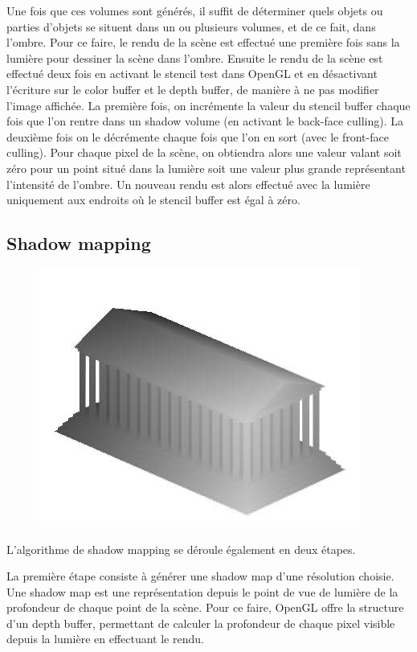 \documentclass[a4paper,10pt]{report}
\begin{document}
Une fois que ces volumes sont générés, il suffit de déterminer quels objets ou parties d'objets se situent dans un ou plusieurs volumes, et de ce fait, dans l'ombre. 
Pour ce faire, le rendu de la scène est effectué une première fois sans la lumière pour dessiner la scène dans l'ombre.
Ensuite le rendu de la scène est effectué deux fois en activant le stencil test dans OpenGL et en désactivant l'écriture sur le color buffer et le depth buffer, de manière à ne pas modifier l'image affichée. La première fois, on incrémente la valeur du stencil buffer chaque fois que l'on rentre dans un shadow volume (en activant le back-face culling). La deuxième fois on le décrémente chaque fois que l'on en sort (avec le front-face culling). Pour chaque pixel de la scène, on obtiendra alors une valeur valant soit zéro pour un point situé dans la lumière soit une valeur plus grande représentant l'intensité de l'ombre.
Un nouveau rendu est alors effectué avec la lumière uniquement aux endroits où le stencil buffer est égal à zéro.


\subsection{Shadow mapping}

\begin{figure}[H]
\includegraphics[scale=0.5]{images/shadow_map.jpg}
\centering
{}
\end{figure}

L'algorithme de shadow mapping se déroule également en deux étapes.

La première étape consiste à générer une shadow map d'une résolution choisie. Une shadow map est une représentation depuis le point de vue de lumière de la profondeur de chaque point de la scène. Pour ce faire, OpenGL offre la structure d'un depth buffer, permettant de calculer la profondeur de chaque pixel visible depuis la lumière en effectuant le rendu.
\end{document}
